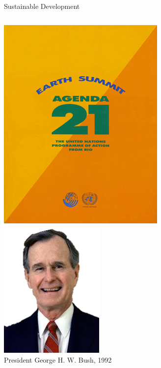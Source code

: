 \begin{frame}{Sustainable Development}
    \begin{columns}[onlytextwidth]
            \centering
            \includegraphics[width=.75\textwidth]{img/agenda-21.png} \\

            \centering
            \includegraphics[width=.75\textwidth]{img/ghwbush.png} \\
            President George H. W. Bush, 1992 \\
    \end{columns}
\end{frame}

